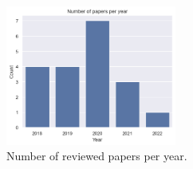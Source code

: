 
\begin{figure}[ht]
\centering
\includegraphics[width=0.5\textwidth]{figures/slr_result_year_paper.png}
\caption{Number of reviewed papers per year. \label{fig:slr_results_year}}
\end{figure}

